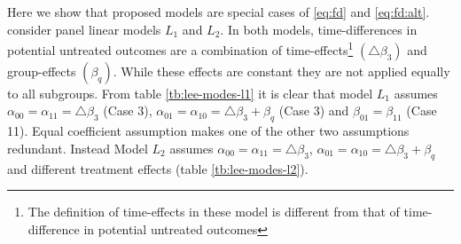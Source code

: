 \documentclass[12pt]{article}
\begin{document}
Here we show that \cite{lee2014difference} proposed models are special cases of \ref{eq:fd} and \ref{eq:fd:alt}. \cite{lee2014difference} consider panel linear models $L_1$ and $L_2$. In both models, time-differences in potential untreated outcomes are a combination of time-effects\footnote{The definition of time-effects in these model is different from that of time-difference in potential untreated outcomes} $(\triangle \beta_3)$ and group-effects $(\beta_q)$. While these effects are constant they are not applied equally to all subgroups. From table \ref{tb:lee-modes-l1} it is clear that model $L_1$ assumes $\alpha_{00} = \alpha_{11} = \triangle \beta_3 $ (Case 3), $\alpha_{01} = \alpha_{10} = \triangle \beta_3 + \beta_q$ (Case 3) and $\beta_{01} = \beta_{11}$ (Case 11). Equal coefficient assumption makes one of the other two assumptions redundant. Instead Model $L_2$ assumes $\alpha_{00} = \alpha_{11} = \triangle \beta_3 $, $\alpha_{01} = \alpha_{10} = \triangle \beta_3 + \beta_q$ and different treatment effects (table \ref{tb:lee-modes-l2}).

\end{document}
